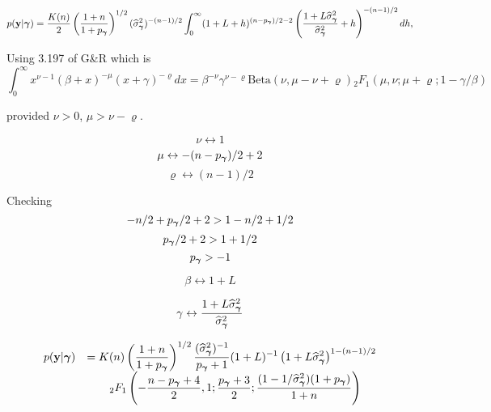 \documentclass{article}[12pt]
\begin{document}
$$
\displaystyle p({\bf y}|{\boldsymbol \gamma})
\displaystyle = \frac{K(n)}{2}\left(\frac{1+n}{1 + p_{\boldsymbol \gamma}}  \right)^{1/2} (\widehat{\sigma}_{\boldsymbol \gamma}^2)^{-(n-1)/2}
\int_0^\infty  (1 + L + h)^{(n - p_{\boldsymbol \gamma})/2 - 2} \left(  \frac{1 + L\widehat{\sigma}_{\boldsymbol \gamma}^2}{\widehat{\sigma}_{\boldsymbol \gamma}^2} + h \right)^{-(n-1)/2} dh,
$$

Using 3.197 of G\&R which is
$$
\int_0^\infty x^{\nu - 1}(\beta + x)^{-\mu}(x + \gamma)^{-\varrho} dx
= \beta^{-\nu}
\gamma^{\nu - \varrho} 
\mbox{Beta}(\nu,\mu - \nu + \varrho)
{}_2F_1(\mu,\nu;\mu+\varrho; 1 - \gamma/\beta)
$$

\noindent provided $\nu>0$, $\mu > \nu - \varrho$.


$$
\nu \leftrightarrow 1
$$ 
$$
\mu \leftrightarrow - (n - p_{\boldsymbol \gamma})/2 + 2
$$
$$
\varrho \leftrightarrow (n-1)/2
$$

\noindent Checking
$$
- n/2 + p_{\boldsymbol \gamma}/2 + 2 > 1 - n/2 + 1/2
$$
$$
p_{\boldsymbol \gamma}/2 + 2 > 1  + 1/2
$$
$$
p_{\boldsymbol \gamma} > -1
$$

$$
\beta \leftrightarrow 1 + L
$$

$$
\gamma \leftrightarrow \frac{1 + L\widehat{\sigma}_{\boldsymbol \gamma}^2}{\widehat{\sigma}_{\boldsymbol \gamma}^2}
$$


$$
\begin{array}{rl}
\displaystyle p({\bf y}|{\boldsymbol \gamma})
\displaystyle 
& \displaystyle = K(n)\left(\frac{1+n}{1 + p_{\boldsymbol \gamma}}  \right)^{1/2} 
\frac{ (\widehat{\sigma}_{\boldsymbol \gamma}^2)^{-1} }{p_{\boldsymbol \gamma}+1} 
(1 + L)^{-1}
\left( 1 + L\widehat{\sigma}_{\boldsymbol \gamma}^2 \right)^{1 - (n-1)/2} 
\\
& \displaystyle \qquad 
{}_2F_1\left( - \frac{n - p_{\boldsymbol \gamma} + 4}{2}, 1;  \frac{ p_{\boldsymbol \gamma}+3}{2} ; 
\frac{(1 - 1/\widehat{\sigma}_{\boldsymbol \gamma}^2)(1 + p_{\boldsymbol \gamma})}{1 + n} \right)
\end{array} 
$$
\end{document}
